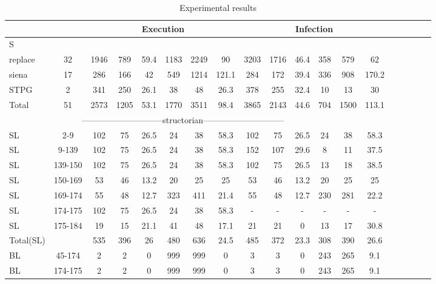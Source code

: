 \begin{table*}
\begin{CodeOut}
\begin{center}
\caption {\label{table:all_results}\scriptsize{Experimental results}}
\begin {tabular} {|l|c|c|c|c|c|c|c|c|c|c|c|c|c|c|c|c|c|c|}
\hline
&&\multicolumn{6}{|c|}{Execution}&\multicolumn{6}{|c|}{Infection}\\ 
\hline
S &\CenterCell{V} &\CenterCell{$E_{\CodeIn{Pex}}$}&\CenterCell{$E_{\CodeIn{eXpress}}$}&\CenterCell{$E_{Red}(\%)$ }&\CenterCell{$Ne_{\CodeIn{Pex}}$}&\CenterCell{$Ne_{\CodeIn{eXpress}}$}&\CenterCell{$Ne_{Inc}(\%)$}&\CenterCell{$I_{\CodeIn{Pex}}$}&\CenterCell{$I_{\CodeIn{eXpress}}$}&\CenterCell{$I_{Red}(\%)$}&\CenterCell{$Ni_{\CodeIn{Pex}}$}&\CenterCell{$Ni_{\CodeIn{eXpress}}$}&\CenterCell{$Ni_{Inc}(\%)$}\\

\hline
replace&32&1946&789&59.4&1183&2249&90&3203&1716&46.4&358&579&62\\
\hline
siena&17&286&166&42&549&1214&121.1&284&172&39.4&336&908&170.2\\
\hline
STPG&2&341&250&26.1&38&48&26.3&378&255&32.4&10&13&30\\
\hline
Total&51&2573&1205&53.1&1770&3511&98.4&3865&2143&44.6&704&1500&113.1\\
\hline
\multicolumn{13}{|c|}{-----------------------------structorian-----------------------------}&\\
\hline
SL&2-9&102&75&26.5&24&38&58.3&102&75&26.5&24&38&58.3\\
\hline
SL&9-139&102&75&26.5&24&38&58.3&152&107&29.6&8&11&37.5\\
\hline
SL&139-150&102&75&26.5&24&38&58.3&102&75&26.5&13&18&38.5\\
\hline
SL&150-169&53&46&13.2&20&25&25&53&46&13.2&20&25&25\\
\hline
SL&169-174&55&48&12.7&323&411&21.4&55&48&12.7&230&281&22.2\\
\hline
SL&174-175&102&75&26.5&24&38&58.3&-&-&-&-&-&-\\
\hline
SL&175-184&19&15&21.1&41&48&17.1&21&21&0&13&17&30.8\\
\hline
Total(SL)&&535&396&26&480&636&24.5&485&372&23.3&308&390&26.6\\
\hline
BL&45-174&2&2&0&999&999&0&3&3&0&243&265&9.1\\
\hline
BL&174-175&2&2&0&999&999&0&3&3&0&243&265&9.1\\
\hline


\end{tabular}
\end{center}
\end{CodeOut}
\end{table*}
